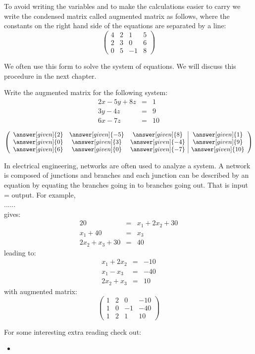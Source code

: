 \documentclass{ximera}
\begin{document}
To avoid writing the variables and to make the calculations easier to carry we write the condensed matrix called augmented matrix as follows, where the constants on the right hand side of the equations are separated by a line:
\[
\left(\begin{array}{ccc|c}
4 & 2 & 1 & 5\\
2 & 3 & 0 & 6\\
0 & 5 & -1 & 8
\end{array}\right)\]

We often use this form to solve the system of equations. We will discuss this procedure in the next chapter.
\begin{question}
  Write the augmented matrix for the following system:
  \begin{eqnarray*}
  2x-5y+8z &=& 1\\
  3y -4z &=& 9\\
  6x -7z &=& 10
  \end{eqnarray*}
  \begin{prompt}
  \[\left(\begin{array}{ccc|c}
  \answer[given]{2} &  \answer[given]{-5} &  \answer[given]{8} & \answer[given]{1}\\
   \answer[given]{0} &  \answer[given]{3} &  \answer[given]{-4} &  \answer[given]{9}\\
   \answer[given]{6} &  \answer[given]{0} &  \answer[given]{-7} &  \answer[given]{10}
  \end{array}\right)
  \]
  \end{prompt}
  \end{question}



\begin{example}[Networks]
In electrical engineering, networks are often used to analyze a system. A network is composed of junctions and branches and each junction can be described by an equation by equating the branches going in to branches going out. That is input = output. For example,\\

......\\

gives:
\begin{eqnarray*}
20 &=& x_{1} + 2x_{2} + 30\\
x_{1} + 40 &=& x_{3}\\
2x_{2} + x_{3} + 30 &=& 40
\end{eqnarray*}
leading to:
\begin{eqnarray*}
x_{1}+2x_{2} &=& -10\\
x_{1} -x_{3}&=& -40\\
2x_{2} + x_{3}  &=& 10
\end{eqnarray*}
with augmented matrix:
\[\left(\begin{array}{ccc|c}
1 & 2 & 0 & -10\\
1 & 0 & -1 & -40\\
1 & 2 & 1 & 10
\end{array}\right)\]
\end{example}


For some interesting extra reading check out:
\begin{itemize}
\item {}
\end{itemize}
\end{document}
